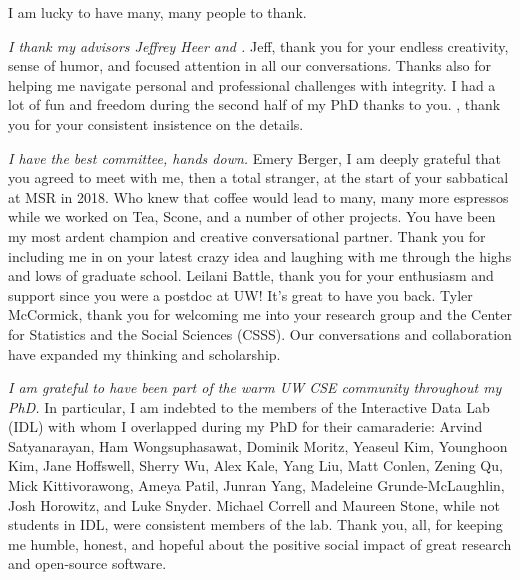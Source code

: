 I am lucky to have many, many people to thank. 

\textit{I thank my advisors Jeffrey Heer and \reneJust.} Jeff, thank you for
your endless creativity, sense of humor, and focused attention in all our
conversations. Thanks also for helping me navigate personal and professional
challenges with integrity. I had a lot of fun and freedom during the second half of my PhD
thanks to you. \rene, thank you for your consistent insistence on
the details.

\textit{I have the best committee, hands down.} Emery Berger, I am deeply grateful
that you agreed to meet with me, then a total stranger, at the start of your
sabbatical at MSR in 2018. Who knew that coffee would lead to many, many
more espressos while we worked on Tea, Scone, and a number of other projects. You have been my most ardent
champion and creative conversational partner. Thank you for including me in on your latest crazy idea and laughing with me
through the highs and lows of graduate school. 
Leilani Battle, thank you for your enthusiasm and support since you were a
postdoc at UW! It's great to have you back.    
Tyler McCormick, thank you for welcoming me into your research group and the
Center for Statistics and the Social Sciences (CSSS). Our conversations and
collaboration have expanded my thinking and scholarship. 

\textit{I am grateful to have been part of the warm UW CSE community throughout
my PhD.} In particular, I am indebted to the members of the Interactive Data Lab
(IDL) with whom I overlapped during my PhD for their camaraderie: Arvind
Satyanarayan, Ham Wongsuphasawat, Dominik Moritz, Yeaseul Kim, Younghoon Kim,
Jane Hoffswell, Sherry Wu, Alex Kale, Yang Liu, Matt Conlen, Zening Qu, Mick
Kittivorawong, Ameya Patil, Junran Yang, Madeleine Grunde-McLaughlin, Josh
Horowitz, and Luke Snyder. Michael Correll and Maureen Stone, while not students
in IDL, were consistent members of the lab. Thank you, all, for keeping me
humble, honest, and hopeful about the positive social impact of great research
and open-source software.

